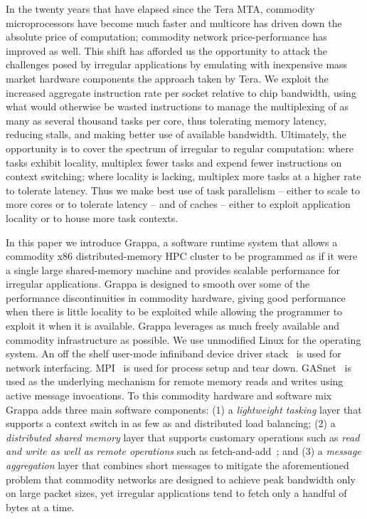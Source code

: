 In the twenty years that have elapsed since the Tera MTA, commodity microprocessors have become much faster and multicore has driven down the absolute price of computation; commodity network price-performance has improved as well.  This shift has afforded us the opportunity to attack the challenges posed by irregular applications by emulating with inexpensive mass market hardware components the approach taken by Tera. We exploit the increased aggregate instruction rate per socket relative to chip bandwidth, using what would otherwise be wasted instructions to manage the multiplexing of as many as several thousand tasks per core, thus tolerating memory latency, reducing stalls, and making better use of available bandwidth.  Ultimately, the opportunity is to cover the spectrum of irregular to regular computation:  where tasks exhibit locality, multiplex fewer tasks and expend fewer instructions on context switching; where locality is lacking, multiplex more tasks at a higher rate to tolerate latency.  Thus we make best use of task parallelism -- either to scale to more cores or to tolerate latency -- and of caches -- either to exploit application locality or to house more task contexts.

In this paper we introduce Grappa, a software runtime system that allows a
commodity x86 distributed-memory HPC cluster to be programmed as if it were a
single large shared-memory machine and provides scalable performance for
irregular applications. Grappa is designed to smooth over some of the
performance discontinuities in commodity hardware, giving good performance
when there is little locality to be exploited while allowing the programmer to
exploit it when it is available. Grappa leverages as much freely available and
commodity infrastructure as possible. We use unmodified Linux for the
operating system. An off the shelf user-mode infiniband device driver
stack~\cite{Melonox?} is used for network interfacing. MPI~\cite{mpi} is used
for process setup and tear down. GASnet~\cite{gasnet} is used as the
underlying mechanism for remote memory reads and writes using active message
invocations. To this commodity hardware and software mix Grappa adds three
main software components: (1) a \emph{lightweight tasking} layer that supports a
context switch in as few as  and distributed load balancing; (2)
a \emph{distributed shared memory} layer that supports customary operations such as
\emph{read and write as well as remote operations} such as
fetch-and-add~\cite{fetchandadd}; and (3) a \emph{message aggregation} layer that
combines short messages to mitigate the aforementioned problem that commodity
networks are designed to achieve peak bandwidth only on large packet sizes,
yet irregular applications tend to fetch only a handful of bytes at a time.



